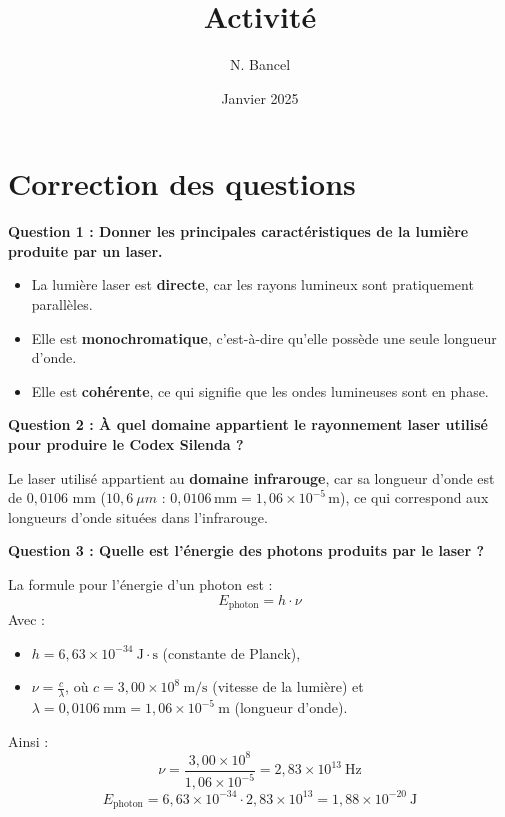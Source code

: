 \documentclass[a4paper,12pt]{article}
\begin{document}
\title{Activité}
\author{N. Bancel}
\date{Janvier 2025}
\maketitle

\section*{Correction des questions}

\textbf{Question 1 : Donner les principales caractéristiques de la lumière produite par un laser.}
\vspace{1em}
\begin{itemize}[noitemsep]
    \item La lumière laser est \textbf{directe}, car les rayons lumineux sont pratiquement parallèles.
    \item Elle est \textbf{monochromatique}, c'est-à-dire qu'elle possède une seule longueur d'onde.
    \item Elle est \textbf{cohérente}, ce qui signifie que les ondes lumineuses sont en phase.
\end{itemize}

\textbf{Question 2 : À quel domaine appartient le rayonnement laser utilisé pour produire le Codex Silenda ?} \par
\vspace{1em}
Le laser utilisé appartient au \textbf{domaine infrarouge}, car sa longueur d'onde est de $0,0106$ mm ($10,6 \ \mu m$ : $0,0106 \, \text{mm} = 1,06 \times 10^{-5} \, \text{m}$), ce qui correspond aux longueurs d'onde situées dans l'infrarouge.

\textbf{Question 3 : Quelle est l'énergie des photons produits par le laser ?} \par 
\vspace{1em}

La formule pour l'énergie d'un photon est :
\[ E_{\text{photon}} = h \cdot \nu \]
Avec :
\begin{itemize}
    \item $h = 6,63 \times 10^{-34} \ \text{J} \cdot \text{s}$ (constante de Planck),
    \item $\nu = \frac{c}{\lambda}$, où $c = 3,00 \times 10^{8} \ \text{m/s}$ (vitesse de la lumière) et $\lambda = 0,0106 \ \text{mm} = 1,06 \times 10^{-5} \ \text{m}$ (longueur d'onde).
\end{itemize}

Ainsi :
\[ \nu = \frac{3,00 \times 10^{8}}{1,06 \times 10^{-5}} = 2,83 \times 10^{13} \ \text{Hz} \]
\[ E_{\text{photon}} = 6,63 \times 10^{-34} \cdot 2,83 \times 10^{13} = 1,88 \times 10^{-20} \ \text{J} \]
\end{document}
